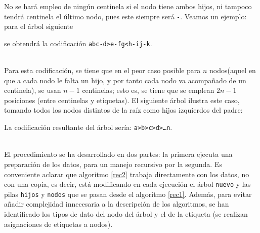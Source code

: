 \documentclass[a4paper,10pt]{scrartcl}
\begin{document}
 No se hará empleo de ningún centinela si el nodo tiene ambos hijos,
 ni tampoco tendrá centinela el último nodo, pues este 
 siempre será \texttt{-}. Veamos un ejemplo: para el árbol siguiente
 
 \begin{center}
 \begin{minipage}{20pt}
 \end{minipage}
 \end{center}
 
 se obtendrá la codificación \texttt{abc-d>e-fg<h-ij-k}.\\\ %
 
 Para esta codificación, se tiene que en el peor caso posible para
 $n$ nodos(aquel en que a cada nodo le falta un hijo, y por tanto cada nodo va acompañado
 de un centinela), se usan $n-1$ centinelas; esto es, se tiene que se
 emplean $2n-1$ posiciones (entre centinelas y etiquetas). 
 El siguiente árbol ilustra este caso, tomando todos los nodos distintos de la raíz como
 hijos izquierdos del padre:\\
 
 \begin{center}
 \begin{minipage}{20pt}
 \end{minipage}
 \end{center}
 
 La codificación resultante del árbol sería: \texttt{a>b>c>d>\ldots n}.\\\
 
 El procedimiento se ha desarrollado en dos partes: la primera ejecuta una
 preparación de los datos, para un manejo recursivo por la segunda. Es conveniente
 aclarar que algoritmo \ref{rec2} trabaja directamente con los
 datos, no con una copia, es decir, está modificando en cada ejecución
 el árbol \texttt{nuevo} y las pilas \texttt{hijos} y \texttt{nodos} que se pasan 
 desde el algoritmo \ref{rec1}. Además, para evitar añadir complejidad
 innecesaria a la descripción de los algoritmos, se han identificado los
 tipos de dato del nodo del árbol y el de la etiqueta (se realizan asignaciones
 de etiquetas a nodos).
  
\end{document}
